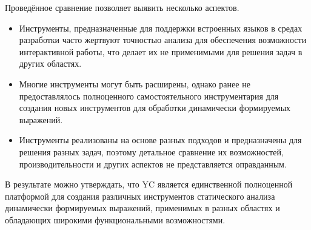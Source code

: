 Проведённое сравнение позволяет выявить несколько аспектов.
\begin{itemize}
    \item Инструменты, предназначенные для поддержки встроенных языков в средах разработки часто жертвуют точностью анализа для обеспечения возможности интерактивной работы, что делает их не применимыми для решения задач в других областях.
    \item Многие инструменты могут быть расширены, однако ранее не предоставлялось полноценного самостоятельного инструментария для создания новых инструментов для обработки динамически формируемых выражений.
    \item Инструменты реализованы на основе разных подходов и предназначены для решения разных задач, поэтому детальное сравнение их возможностей, производительности и других аспектов не представляется оправданным.
\end{itemize}

В результате можно утверждать, что YC является единственной полноценной платформой для создания различных инструментов статического анализа динамически формируемых выражений, применимых в разных областях и обладающих широкими функциональными возможностями.



